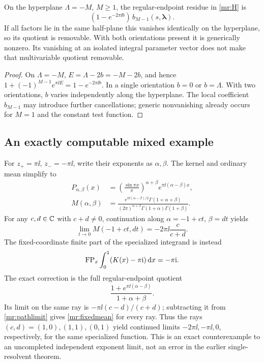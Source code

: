 \begin{corollary}
\label{mr:phasepole}
On the hyperplane $\Lambda=-M$, $M\ge1$, the regular-endpoint
residue in \eqref{mr:H} is
\begin{equation}\label{mr:mixedresidue}
       (1-e^{-2\pi\ii b})\,b_{M-1}(s,\boldsymbol\lambda).
\end{equation}
If all factors lie in the same half-plane this vanishes identically on
the hyperplane, so its quotient is removable. With both orientations
present it is generically nonzero. Its vanishing at an isolated integral
parameter vector does not make that multivariable quotient removable.
\end{corollary}
\begin{proof}
On $\Lambda=-M$, $E=\Lambda-2b=-M-2b$, and hence
$1+(-1)^{M-1}e^{\pi\ii E}=1-e^{-2\pi\ii b}$.
In a single orientation $b=0$ or $b=\Lambda$. With two orientations,
$b$ varies independently along the hyperplane. The local coefficient
$b_{M-1}$ may introduce further cancellations; generic nonvanishing
already occurs for $M=1$ and the constant test function.
\end{proof}

\subsection{An exactly computable mixed example}

For $z_+=\pi\ii$, $z_-=-\pi\ii$, write their exponents as
$\alpha,\beta$. The kernel and ordinary mean simplify to
\begin{align}
 P_{\alpha,\beta}(x)
   &=\left(\frac{\sin\pi x}{\pi}\right)^{\alpha+\beta}
                           e^{\pi\ii(\alpha-\beta)x},\label{mr:specialkernel}\\
 M(\alpha,\beta)
   &=\frac{e^{\pi\ii(\alpha-\beta)/2}\Gamma(1+\alpha+\beta)}
      {(2\pi)^{\alpha+\beta}\Gamma(1+\alpha)\Gamma(1+\beta)}.
       \label{mr:specialmean}
\end{align}
For any $c,d\in\mathbb C$ with $c+d\ne0$, continuation along
$\alpha=-1+ct$, $\beta=dt$ yields
\begin{equation}\label{mr:pathlimit}
           \lim_{t\to0}M(-1+ct,dt)=-2\pi\ii\frac{c}{c+d}.
\end{equation}
The fixed-coordinate finite part of the specialized integrand is instead
\begin{equation}\label{mr:fixedmean}
       \operatorname{FP}_x\int_0^1(K(x)-\pi\mathrm i)\,\mathrm d x=-\pi\mathrm i.
\end{equation}
The exact correction is the full regular-endpoint quotient
\[
 \frac{1+e^{\pi\ii(\alpha-\beta)}}{1+\alpha+\beta}.
\]
Its limit on the same ray is $-\pi\ii(c-d)/(c+d)$; subtracting it
from \eqref{mr:pathlimit} gives \eqref{mr:fixedmean} for every ray.
Thus the rays $(c,d)=(1,0),(1,1),(0,1)$ yield continued limits
$-2\pi\ii,-\pi\ii,0$, respectively, for the same specialized
function. This is an exact counterexample to an uncompleted independent
exponent limit, not an error in the earlier single-resolvent theorem.

